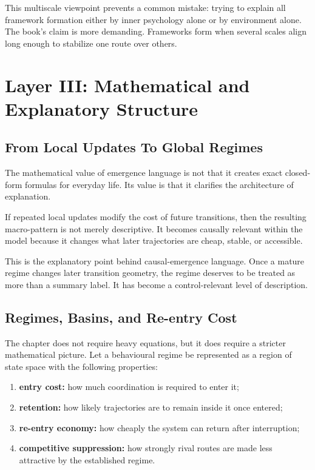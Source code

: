 This multiscale viewpoint prevents a common mistake: trying to explain all
framework formation either by inner psychology alone or by environment alone.
The book's claim is more demanding. Frameworks form when several scales align
long enough to stabilize one route over others.

\section{Layer III: Mathematical and Explanatory Structure}

\subsection{From Local Updates To Global Regimes}

The mathematical value of emergence language is not that it creates exact
closed-form formulas for everyday life. Its value is that it clarifies the
architecture of explanation.

\begin{proposition}
If repeated local updates modify the cost of future transitions, then the
resulting macro-pattern is not merely descriptive. It becomes causally
relevant within the model because it changes what later trajectories are cheap,
stable, or accessible.
\end{proposition}

\begin{discussion}
This is the explanatory point behind causal-emergence language. Once a mature
regime changes later transition geometry, the regime deserves to be treated as
more than a summary label. It has become a control-relevant level of
description.
\end{discussion}

\subsection{Regimes, Basins, and Re-entry Cost}

The chapter does not require heavy equations, but it does require a stricter
mathematical picture. Let a behavioural regime be represented as a region of
state space with the following properties:
\begin{enumerate}[nosep]
  \item \textbf{entry cost:} how much coordination is required to enter it;
  \item \textbf{retention:} how likely trajectories are to remain inside it
        once entered;
  \item \textbf{re-entry economy:} how cheaply the system can return after
        interruption;
  \item \textbf{competitive suppression:} how strongly rival routes are made
        less attractive by the established regime.
\end{enumerate}

